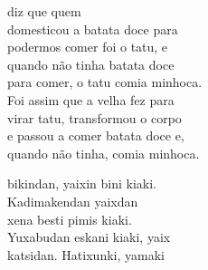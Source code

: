 

 diz que quem\\
domesticou a batata doce para\\
podermos comer foi o tatu, e\\
quando não tinha batata doce\\
para comer, o tatu comia minhoca.\\
Foi assim que a velha fez para\\
virar tatu, transformou o corpo\\
e passou a comer batata doce e,\\
quando não tinha, comia minhoca.

\vspace{2em}

 bikindan, yaixin bini kiaki.\\
Kadimakendan yaixdan\\
xena besti pimis kiaki.\\
Yuxabudan eskani kiaki, yaix\\
katsidan. Hatixunki, yamaki

\vspace*{\fill}

